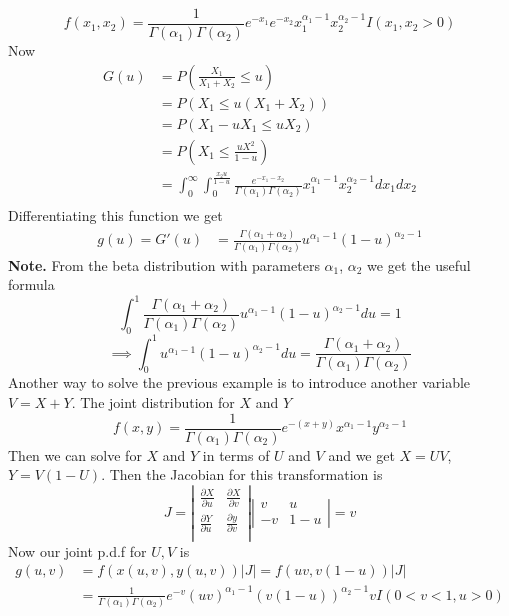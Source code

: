 \documentclass[openany]{report}
\begin{document}
    \[f(x_1,x_2) = \frac{1}{\Gamma(\alpha_1)\Gamma(\alpha_2)}e^{-x_1}e^{-x_2}x_1^{\alpha_1-1}x_2^{\alpha_2-1}I(x_1, x_2 > 0)\]
    Now 
    \begin{align*}
        G(u) &= P\left(\frac{X_1}{X_1 + X_2} \leq u\right)\\
        &= P(X_1 \leq u(X_1 + X_2))\\
        &= P(X_1 - uX_1 \leq uX_2)\\
        &= P\left(X_1 \leq \frac{uX^2}{1-u}\right)\\
        &= \int_0^\infty\int_0^{\frac{x_2u}{1-u}} \frac{e^{-x_1 - x_2}}{\Gamma(\alpha_1)\Gamma(\alpha_2)}x_1^{\alpha_1-1}x_2^{\alpha_2 - 1}dx_1dx_2\\
    \end{align*}
    Differentiating this function we get 
    \begin{align*}
        g(u) = G'(u) &= \frac{\Gamma(\alpha_1 + \alpha_2)}{\Gamma(\alpha_1)\Gamma(\alpha_2)}u^{\alpha_1 - 1}(1-u)^{\alpha_2 - 1}
    \end{align*}
    \textbf{Note.} From the beta distribution with parameters $\alpha_1$, $\alpha_2$ we get the useful formula 
    \[\int_0^1 \frac{\Gamma(\alpha_1 + \alpha_2)}{\Gamma(\alpha_1)\Gamma(\alpha_2)}u^{\alpha_1-1}(1-u)^{\alpha_2 - 1} du = 1\]
    \[\implies \int_0^1 u^{\alpha_1-1}(1-u)^{\alpha_2 - 1} du = \frac{\Gamma(\alpha_1 + \alpha_2)}{\Gamma(\alpha_1)\Gamma(\alpha_2)}\]
    Another way to solve the previous example is to introduce another variable $V = X + Y$. The joint distribution for $X$ and $Y$ 
    \[f(x,y) = \frac{1}{\Gamma(\alpha_1)\Gamma(\alpha_2)}e^{-(x+y)}x^{\alpha_1 - 1}y^{\alpha_2-1}\]
    Then we can solve for $X$ and $Y$ in terms of $U$ and $V$ and we get $X = UV$, $Y = V(1 - U)$. Then the Jacobian for this transformation is 
    \[J = \left|\begin{matrix}
        \frac{\partial X}{\partial u} & \frac{\partial X}{\partial v}\\
        \frac{\partial Y}{\partial u} & \frac{\partial y}{\partial v}\\
    \end{matrix}\right| \left|\begin{matrix}
        v & u\\
        -v & 1 - u
    \end{matrix}\right| = v\]
    Now our joint p.d.f for $U,V$ is  
    \begin{align*}
        g(u,v) &= f(x(u,v), y(u,v))|J| = f(uv, v(1-u))|J|\\
        &= \frac{1}{\Gamma(\alpha_1)\Gamma(\alpha_2)}e^{-v}(uv)^{\alpha_1 - 1}(v(1-u))^{\alpha_2-1}vI(0 < v < 1, u > 0)
    \end{align*}
\end{document}

